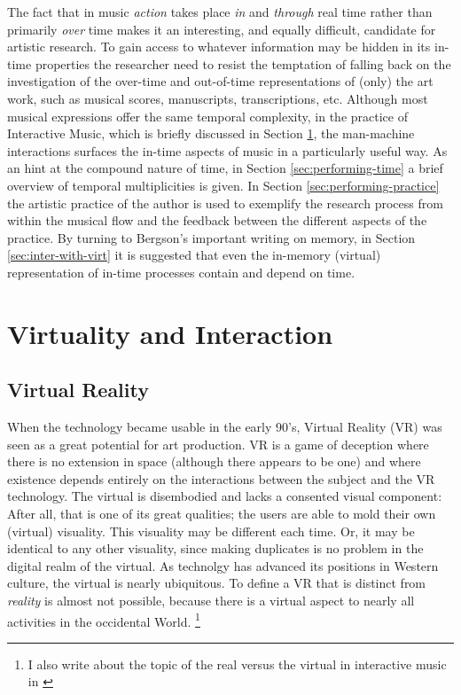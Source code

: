 The fact that in music \emph{action} takes place \emph{in} and \emph{through} real time rather than primarily \emph{over} time makes it an interesting, and equally difficult, candidate for artistic research. To gain access to whatever information may be hidden in its in-time properties the researcher need to resist the temptation of falling back on the investigation of the over-time and out-of-time representations of (only) the art work, such as musical scores, manuscripts, transcriptions, etc. Although most musical expressions offer the same temporal complexity, in the practice of Interactive Music, which is briefly discussed in Section \ref{sec:why-interaction}, the man-machine interactions surfaces the in-time aspects of music in a particularly useful way. As an hint at the compound nature of time, in Section \ref{sec:performing-time} a brief overview of temporal multiplicities is given. In Section \ref{sec:performing-practice} the artistic practice of the author is used to exemplify the research process from within the musical flow and the feedback between the different aspects of the practice. By turning to Bergson's important writing on memory, in Section \ref{sec:inter-with-virt} it is suggested that even the in-memory (virtual) representation of in-time processes contain and depend on time.

\section{Virtuality and Interaction}
\label{sec:why-interaction}

\subsection*{Virtual Reality}
\label{sec:virtual-reality}

When the technology became usable in the early 90's, Virtual Reality (VR) was seen as a great potential for art production. \parencite[See for example:][]{moser96,wood98,dixon07} VR is a game of deception where there is no extension in space (although there appears to be one) and where existence depends entirely on the interactions between the subject and the VR technology. The virtual is disembodied and lacks a consented visual component: After all, that is one of its great qualities; the users are able to mold their own (virtual) visuality. \parencite[Compare to William Gibson's famous definition of Cyberspace as a ``consensual hallucination'':][51]{gibson84} This visuality may be different each time. Or, it may be identical to any other visuality, since making duplicates is no problem in the digital realm of the virtual. As technolgy has advanced its positions in Western culture, the virtual is nearly ubiquitous. To define a VR that is distinct from \emph{reality} is almost not possible, because there is a virtual aspect to nearly all activities in the occidental World. \parencite[See][]{baudrillard02:screened}\footnote{I also write about the topic of the real versus the virtual in interactive music in \parencite[ch. 4]{frisk08}} 

